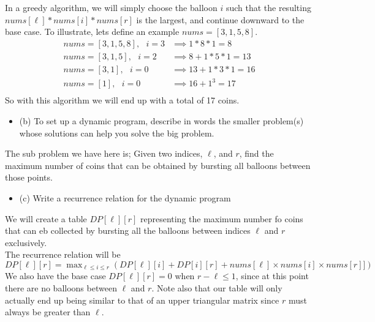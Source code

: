 \documentclass{article}
\begin{document}
\begin{enumerate}
In a greedy algorithm, we will simply choose the balloon $i$ such that the resulting $nums[\ell] * nums[i] * nums[r]$ is the largest, and continue downward to the base case. To illustrate, lets define an example $nums = [3, 1, 5, 8]$. \\
\begin{align*}
    nums = [3, 1, 5, 8], \text{ } i = 3 & \implies 1 * 8 * 1 = 8 \\
    nums = [3, 1, 5], \text{ } i = 2 & \implies 8 + 1 * 5 * 1 = 13 \\
    nums = [3, 1], \text{ } i = 0 & \implies 13 + 1 * 3 * 1 = 16 \\
    nums = [1], \text{ } i = 0 & \implies 16 + 1^3 = 17 \\
\end{align*}
So with this algorithm we will end up with a total of 17 coins.






\begin{itemize}
    \item (b) To set up a dynamic program, describe in words the smaller problem(s) whose solutions can help you solve the big problem. 
\end{itemize}
The sub problem we have here is; Given two indices, $\ell$, and $r$, find the maximum number of coins that can be obtained by bursting all balloons between those points. \\
\newline 








\begin{itemize}
    \item (c) Write a recurrence relation for the dynamic program
\end{itemize}
We will create a table $DP[\ell][r]$ representing the maximum number fo coins that can eb collected by bursting all the balloons between indices $\ell$ and $r$ exclusively. \\
The recurrence relation will be $DP[\ell][r] = \max_{\ell \leq i \leq r}(DP[\ell][i] + DP[i][r] + nums[\ell] \times nums[i] \times nums[r]])$ \\
\newline 
We also have the base case $DP[\ell][r] = 0$ when $r - \ell \leq 1$, since at this point there are no balloons between $\ell$ and $r$. Note also that our table will only actually end up being similar to that of an upper triangular matrix since $r$ must always be greater than $\ell$.






\end{enumerate}
\end{document}
